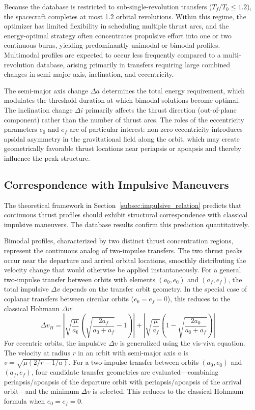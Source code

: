 \documentclass[a4paper,fleqn]{cas-dc}
\let\origsubsection\subsection
\renewcommand{\subsection}{\FloatBarrier\origsubsection}
\begin{document}
Because the database is restricted to sub-single-revolution transfers ($T_f/T_0 \leq 1.2$), the spacecraft completes at most 1.2 orbital revolutions. Within this regime, the optimizer has limited flexibility in scheduling multiple thrust arcs, and the energy-optimal strategy often concentrates propulsive effort into one or two continuous burns, yielding predominantly unimodal or bimodal profiles. Multimodal profiles are expected to occur less frequently compared to a multi-revolution database, arising primarily in transfers requiring large combined changes in semi-major axis, inclination, and eccentricity.

The semi-major axis change $\Delta a$ determines the total energy requirement, which modulates the threshold duration at which bimodal solutions become optimal. The inclination change $\Delta i$ primarily affects the thrust direction (out-of-plane component) rather than the number of thrust arcs. The roles of the eccentricity parameters $e_0$ and $e_f$ are of particular interest: non-zero eccentricity introduces apsidal asymmetry in the gravitational field along the orbit, which may create geometrically favorable thrust locations near periapsis or apoapsis and thereby influence the peak structure.

\subsection{Correspondence with Impulsive Maneuvers}\label{subsec:impulsive_correspondence}

The theoretical framework in Section~\ref{subsec:impulsive_relation} predicts that continuous thrust profiles should exhibit structural correspondence with classical impulsive maneuvers. The database results confirm this prediction quantitatively.

Bimodal profiles, characterized by two distinct thrust concentration regions, represent the continuous analog of two-impulse transfers. The two thrust peaks occur near the departure and arrival orbital locations, smoothly distributing the velocity change that would otherwise be applied instantaneously. For a general two-impulse transfer between orbits with elements $(a_0, e_0)$ and $(a_f, e_f)$, the total impulsive $\Delta v$ depends on the transfer orbit geometry. In the special case of coplanar transfers between circular orbits ($e_0 = e_f = 0$), this reduces to the classical Hohmann $\Delta v$:
\begin{equation}\label{eq:hohmann_dv}
\Delta v_H = \left|\sqrt{\frac{\mu}{a_0}}\left(\sqrt{\frac{2a_f}{a_0+a_f}} - 1\right)\right| + \left|\sqrt{\frac{\mu}{a_f}}\left(1 - \sqrt{\frac{2a_0}{a_0+a_f}}\right)\right|
\end{equation}
For eccentric orbits, the impulsive $\Delta v$ is generalized using the vis-viva equation. The velocity at radius $r$ in an orbit with semi-major axis $a$ is $v = \sqrt{\mu(2/r - 1/a)}$. For a two-impulse transfer between orbits $(a_0, e_0)$ and $(a_f, e_f)$, four candidate transfer geometries are evaluated---combining periapsis/apoapsis of the departure orbit with periapsis/apoapsis of the arrival orbit---and the minimum $\Delta v$ is selected. This reduces to the classical Hohmann formula when $e_0 = e_f = 0$.
\end{document}
